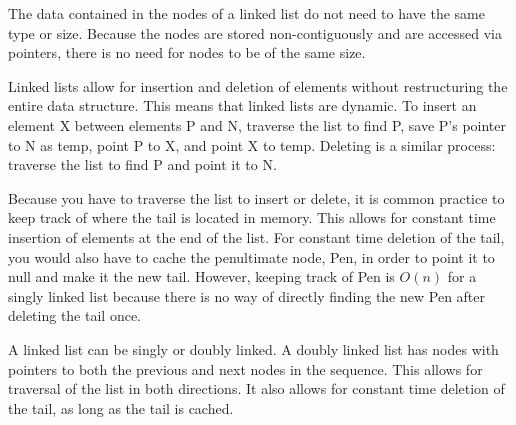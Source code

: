 The data contained in the nodes of a linked list do not need to have the same type or size. Because the nodes are stored non-contiguously and are accessed via pointers, there is no need for nodes to be of the same size.

Linked lists allow for insertion and deletion of elements without restructuring the entire data structure. This means that linked lists are dynamic. To insert an element X between elements P and N, traverse the list to find P, save P's pointer to N as temp, point P to X, and point X to temp. Deleting is a similar process: traverse the list to find P and point it to N.

Because you have to traverse the list to insert or delete, it is common practice to keep track of where the tail is located in memory. This allows for constant time insertion of elements at the end of the list. For constant time deletion of the tail, you would also have to cache the penultimate node, Pen, in order to point it to null and make it the new tail. However, keeping track of Pen is $O(n)$ for a singly linked list because there is no way of directly finding the new Pen after deleting the tail once.

A linked list can be singly or doubly linked. A doubly linked list has nodes with pointers to both the previous and next nodes in the sequence. This allows for traversal of the list in both directions. It also allows for constant time deletion of the tail, as long as the tail is cached.

